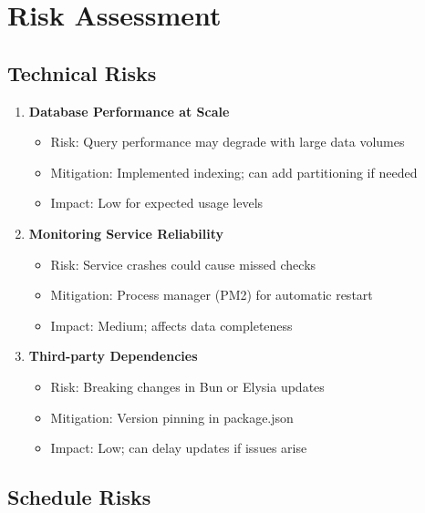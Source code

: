\section{Risk Assessment}

\subsection{Technical Risks}

\begin{enumerate}
    \item \textbf{Database Performance at Scale}
    \begin{itemize}
        \item Risk: Query performance may degrade with large data volumes
        \item Mitigation: Implemented indexing; can add partitioning if needed
        \item Impact: Low for expected usage levels
    \end{itemize}
    
    \item \textbf{Monitoring Service Reliability}
    \begin{itemize}
        \item Risk: Service crashes could cause missed checks
        \item Mitigation: Process manager (PM2) for automatic restart
        \item Impact: Medium; affects data completeness
    \end{itemize}
    
    \item \textbf{Third-party Dependencies}
    \begin{itemize}
        \item Risk: Breaking changes in Bun or Elysia updates
        \item Mitigation: Version pinning in package.json
        \item Impact: Low; can delay updates if issues arise
    \end{itemize}
\end{enumerate}

\subsection{Schedule Risks}

